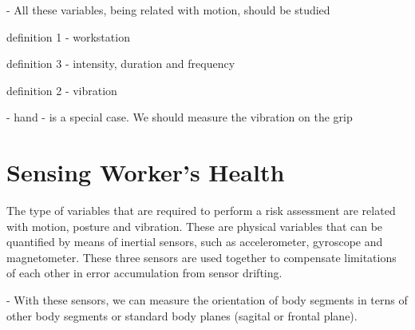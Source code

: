 - All these variables, being related with motion, should be studied  

definition 1 - workstation

definition 3 - intensity, duration and frequency

definition 2 - vibration

- hand - is a special case. We should measure the vibration on the grip 


\section{Sensing Worker's Health}
\label{sec:sensing_worker}

The type of variables that are required to perform a risk assessment are related with motion, posture and vibration. These are physical variables that can be quantified by means of inertial sensors, such as accelerometer, gyroscope and magnetometer. These three sensors are used together to compensate limitations of each other in error accumulation from sensor drifting.

- With these sensors, we can measure the orientation of body segments in terns of other body segments or standard body planes (sagital or frontal plane). 